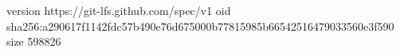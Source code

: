 version https://git-lfs.github.com/spec/v1
oid sha256:a290617f1142fdc57b490e76d675000b77815985b66542516479033560e3f590
size 598826
